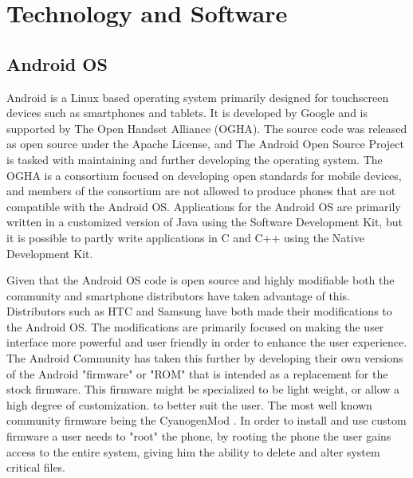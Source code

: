 \chapter{Technology and Software}


\section{Android OS}
Android is a Linux based operating system primarily designed for touchscreen devices such as smartphones and tablets. It is developed by Google and is supported by The Open Handset Alliance (OGHA). The source code was released as open source under the Apache License, and The Android Open Source Project is tasked with maintaining and further developing the operating system. The OGHA is a consortium focused on developing open standards for mobile devices, and members of the consortium are not allowed to produce phones that are not compatible with the Android OS. Applications for the Android OS are primarily written in a customized version of Java using the Software Development Kit, but it is possible to partly write applications in C and C++ using the Native Development Kit. 

Given that the Android OS code is open source and highly modifiable both the community and smartphone distributors have taken advantage of this. Distributors such as HTC and Samsung have both made their modifications to the Android OS. The modifications are primarily focused on making the user interface more powerful and user friendly in order to enhance the user experience\cite{htcSense}. The Android Community has taken this further by developing their own versions of the Android "firmware" or "ROM" that is intended as a replacement for the stock firmware. This firmware might be specialized to be light weight, or allow a high degree of customization. to better suit the user. The most well known community firmware being the CyanogenMod \cite{cyanogenMod}. In order to install and use custom firmware a user needs to "root" the phone, by rooting the phone the user gains access to the entire system, giving him the ability to delete and alter system critical files.

